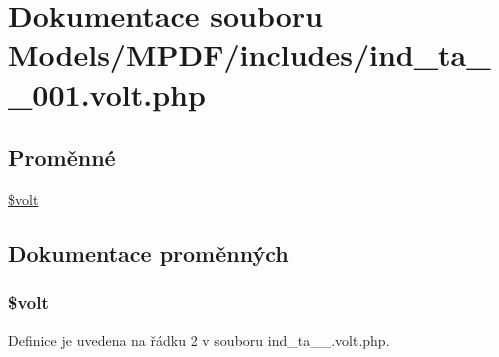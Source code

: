 \hypertarget{ind__ta__1__001_8volt_8php}{\section{Dokumentace souboru Models/\-M\-P\-D\-F/includes/ind\-\_\-ta\-\_\-\_\-001.volt.\-php}
\label{ind__ta__1__001_8volt_8php}
}
\subsection*{Proměnné}
\begin{DoxyCompactItemize}
\item 
\hyperlink{ind__ta__1__001_8volt_8php_a013d9bcd621d002433e25a82dd593989}{\$volt}
\end{DoxyCompactItemize}


\subsection{Dokumentace proměnných}
\hypertarget{ind__ta__1__001_8volt_8php_a013d9bcd621d002433e25a82dd593989}{
\subsubsection[{\$volt}]{\setlength{\rightskip}{0pt plus 5cm}\$volt}}\label{ind__ta__1__001_8volt_8php_a013d9bcd621d002433e25a82dd593989}


Definice je uvedena na řádku 2 v souboru ind\-\_\-ta\-\_\-\_.\-volt.\-php.

